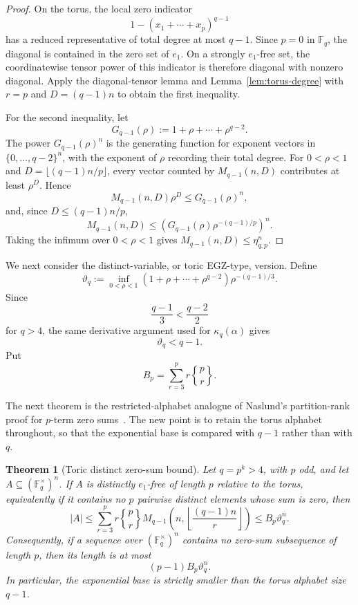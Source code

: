 \documentclass[10pt,a4paper]{amsart}
\newtheorem{theorem}{Theorem}[section]
\theoremstyle{definition}
\newcommand{\F}{\mathbb F}
\newcommand{\1}{\mathbf 1}
\newcommand{\StirlingTwo}[2]{\genfrac\{\}{0pt}{}{#1}{#2}}
\begin{document}
\begin{proof}
On the torus, the local zero indicator
\[
 1-(x_1+\cdots+x_p)^{q-1}
\]
has a reduced representative of total degree at most $q-1$.  Since $p=0$ in $\F_q$, the diagonal is contained in the zero set of $e_1$.  On a strongly $e_1$-free set, the coordinatewise tensor power of this indicator is therefore diagonal with nonzero diagonal.  Apply the diagonal-tensor lemma and Lemma~\ref{lem:torus-degree} with $r=p$ and $D=(q-1)n$ to obtain the first inequality.

For the second inequality, let
\[
 G_{q-1}(\rho):=1+\rho+\cdots+\rho^{q-2}.
\]
The power $G_{q-1}(\rho)^n$ is the generating function for exponent vectors in $\{0,\ldots,q-2\}^n$, with the exponent of $\rho$ recording their total degree.  For $0<\rho<1$ and
$D=\lfloor(q-1)n/p\rfloor$, every vector counted by $M_{q-1}(n,D)$ contributes at least $\rho^D$.  Hence
\[
 M_{q-1}(n,D)\rho^D
 \le G_{q-1}(\rho)^n,
\]
and, since $D\le(q-1)n/p$,
\[
 M_{q-1}(n,D)
 \le\left(G_{q-1}(\rho)\rho^{-(q-1)/p}\right)^n.
\]
Taking the infimum over $0<\rho<1$ gives
$M_{q-1}(n,D)\le\eta_{q,p}^n$.
\end{proof}

We next consider the distinct-variable, or toric EGZ-type, version.  Define
\[
 \vartheta_q:=
 \inf_{0<\rho<1}
 (1+\rho+\cdots+\rho^{q-2})
 \rho^{-(q-1)/3}.
\]
Since
\[
 \frac{q-1}{3}<\frac{q-2}{2}
\]
for $q>4$, the same derivative argument used for $\kappa_q(\alpha)$ gives
\[
 \vartheta_q<q-1.
\]
Put
\[
 B_p=\sum_{r=3}^p r\StirlingTwo{p}{r}.
\]

The next theorem is the restricted-alphabet analogue of Naslund's partition-rank proof for $p$-term zero sums~\cite{NaslundEGZ}.  The new point is to retain the torus alphabet throughout, so that the exponential base is compared with $q-1$ rather than with $q$.

\begin{theorem}[Toric distinct zero-sum bound]\label{thm:toric-zero-sum}
Let $q=p^k>4$, with $p$ odd, and let $A\subseteq(\F_q^\times)^n$.  If $A$ is distinctly $e_1$-free of length $p$ relative to the torus, equivalently if it contains no $p$ pairwise distinct elements whose sum is zero, then
\[
 |A|\le
 \sum_{r=3}^p r\StirlingTwo{p}{r}
 M_{q-1}\left(n,\left\lfloor\frac{(q-1)n}{r}\right\rfloor\right)
 \le B_p\vartheta_q^n.
\]
Consequently, if a sequence over $(\F_q^\times)^n$ contains no zero-sum subsequence of length $p$, then its length is at most
\[
 (p-1)B_p\vartheta_q^n.
\]
In particular, the exponential base is strictly smaller than the torus alphabet size $q-1$.
\end{theorem}
\end{document}
